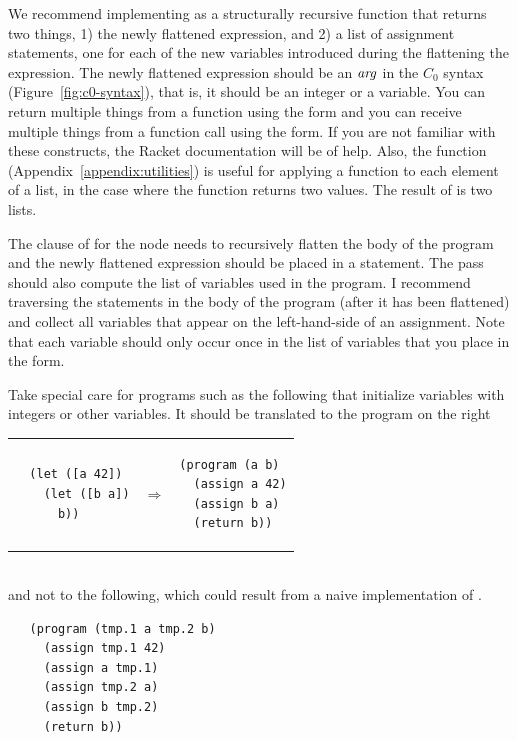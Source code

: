 \documentclass[11pt]{book}
\begin{document}
We recommend implementing  as a structurally recursive
function that returns two things, 1) the newly flattened expression,
and 2) a list of assignment statements, one for each of the new
variables introduced during the flattening the expression.  The newly
flattened expression should be an $\mathit{arg}$ in the $C_0$ syntax
(Figure~\ref{fig:c0-syntax}), that is, it should be an integer or a
variable. You can return multiple things from a function using the
 form and you can receive multiple things from a function
call using the  form. If you are not familiar with
these constructs, the Racket documentation will be of help. Also, the
 function (Appendix~\ref{appendix:utilities}) is useful for
applying a function to each element of a list, in the case where the
function returns two values. The result of  is two lists.

The clause of  for the  node needs to
recursively flatten the body of the program and the newly flattened
expression should be placed in a  statement.  The
 pass should also compute the list of variables used in
the program.  I recommend traversing the statements in the body of the
program (after it has been flattened) and collect all variables that
appear on the left-hand-side of an assignment. Note that each variable
should only occur once in the list of variables that you place in the
 form.

Take special care for programs such as the following that initialize
variables with integers or other variables. It should be translated
to the program on the right \\
\begin{tabular}{lll}
\begin{minipage}{0.4\textwidth}
\begin{lstlisting}
  (let ([a 42])
    (let ([b a])
      b))
\end{lstlisting}
\end{minipage}
&
$\Rightarrow$
&
\begin{minipage}{0.4\textwidth}
\begin{lstlisting}
(program (a b)
  (assign a 42)
  (assign b a)
  (return b))
\end{lstlisting}
\end{minipage}
\end{tabular} \\
and not to the following, which could result from a naive
implementation of .
\begin{lstlisting}
   (program (tmp.1 a tmp.2 b)
     (assign tmp.1 42)
     (assign a tmp.1)
     (assign tmp.2 a)
     (assign b tmp.2)
     (return b))
\end{lstlisting}
\end{document}
